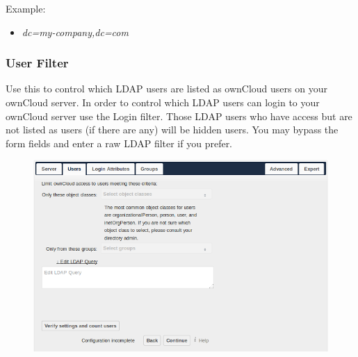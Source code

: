 \documentclass[letterpaper,10pt,english]{sphinxmanual}
\begin{document}
\begin{description}
Example:
\begin{itemize}
\item {} 
\emph{dc=my-company,dc=com}

\end{itemize}

\end{description}


\subsubsection{User Filter}
\label{configuration_user/user_auth_ldap:user-filter}
Use this to control which LDAP users are listed as ownCloud users on your
ownCloud server. In order to control which LDAP users can login to your ownCloud
server use the Login filter. Those LDAP users who have access but are not listed
as users (if there are any) will be hidden users. You may bypass the form fields
and enter a raw LDAP filter if you prefer.
\begin{figure}[htbp]
\centering

\includegraphics{ldap-wizard-2-user.png}
\end{figure}
\end{document}
